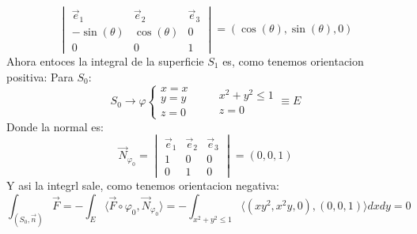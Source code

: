 {$$\begin{vmatrix}
        \vec{e}_1 & \vec{e}_2 & \vec{e}_3 \\
        -\sin(\theta) & \cos(\theta) & 0 \\
        0 & 0 & 1
    \end{vmatrix} = (\cos(\theta), \sin(\theta), 0)$$
    Ahora entoces la integral de la superficie $S_1$ es, como tenemos orientacion positiva:
    Para $S_0$:
    $$ S_0 \to \varphi \begin{cases}
        x = x \\
        y = y \\
        z = 0 
    \end{cases} \qquad
    \begin{matrix}
        x^2 + y^2 \leq 1 \\
        z = 0
    \end{matrix} \equiv E$$
    Donde la normal es:
    $$ \vec{N}_{\varphi_0} =
    \begin{vmatrix}
        \vec{e}_1 & \vec{e}_2 & \vec{e}_3 \\
        1 & 0 & 0 \\
        0 & 1 & 0
    \end{vmatrix} = (0,0,1)$$
    Y asi la integrl sale, como tenemos orientacion negativa:
    $$ \int_{(S_0, \vec{n})} \vec{F} = - \int_E \langle \vec{F} \circ \varphi_0, \vec{N}_{\varphi_0} \rangle = -\int_{x^2 + y^2 \leq 1} \langle (xy^2,x^2y,0), (0,0,1) \rangle dx dy = 0$$
}

